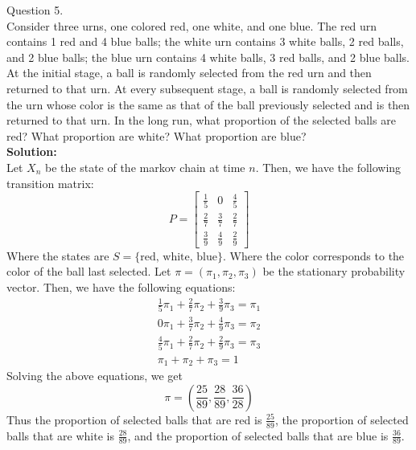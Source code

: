 \documentclass[answers,12pt,addpoints]{exam}
\begin{document}
\begin{questions}
\question Question 5.\\
Consider three urns, one colored red, one white, and one blue. The red urn contains 1 red and 4
blue balls; the white urn contains 3 white balls, 2 red balls, and 2 blue balls; the blue urn contains
4 white balls, 3 red balls, and 2 blue balls. At the initial stage, a ball is randomly selected from
the red urn and then returned to that urn. At every subsequent stage, a ball is randomly selected
from the urn whose color is the same as that of the ball previously selected and is then returned
to that urn. In the long run, what proportion of the selected balls are red? What proportion are
white? What proportion are blue?\\
\textbf{Solution:}\\
Let $X_n$ be the state of the markov chain at time $n$. Then, we have the following transition matrix:
$$P = \begin{bmatrix}
    \frac{1}{5} & 0 & \frac{4}{5}\\
    \frac{2}{7} & \frac{3}{7} & \frac{2}{7}\\
    \frac{3}{9} & \frac{4}{9} & \frac{2}{9}
\end{bmatrix}$$
Where the states are $S = \{ \text{red, white, blue} \}$. Where the color corresponds to the color of the ball last selected.
Let $\pi = (\pi_1, \pi_2, \pi_3)$ be the stationary probability vector. Then, we have the following equations:
\begin{align*}
    \frac{1}{5}\pi_1 + \frac{2}{7}\pi_2 + \frac{3}{9}\pi_3 = \pi_1\\
    0\pi_1 + \frac{3}{7}\pi_2 + \frac{4}{9}\pi_3 = \pi_2\\
    \frac{4}{5}\pi_1 + \frac{2}{7}\pi_2 + \frac{2}{9}\pi_3 = \pi_3\\
    \pi_1 + \pi_2 + \pi_3 = 1
\end{align*}
Solving the above equations, we get
$$\pi = (\frac{25}{89}, \frac{28}{89}, \frac{36}{28})$$
Thus the proportion of selected balls that are red is $\frac{25}{89}$, the proportion of selected balls that are white is $\frac{28}{89}$, and the proportion of selected balls that are blue is $\frac{36}{89}$.


\end{questions}
\end{document}
